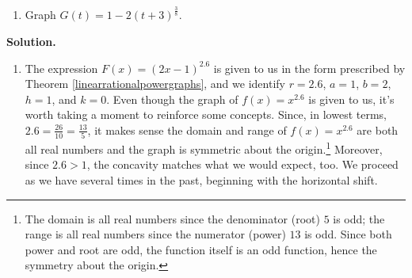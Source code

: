 \documentclass{ximera}
\begin{document}
\begin{example}
\begin{enumerate}
\item  Graph $G(t) = 1 - 2(t+3)^{\frac{3}{8}}$.


\end{enumerate}

 \begin{image}
\end{image}


{\bf Solution.}

\begin{enumerate}

\item  The expression  $F(x) = (2x-1)^{2.6}$ is given to us in the form prescribed by Theorem \ref{linearrationalpowergraphs}, and we identify $r = 2.6$, $a = 1$, $b=2$, $h=1$, and $k=0$.  Even though the graph of $f(x) = x^{2.6}$ is given to us, it's worth taking a moment to reinforce some concepts.  Since, in lowest terms, $2.6 = \frac{26}{10} = \frac{13}{5}$, it makes sense the domain and range of $f(x) = x^{2.6}$ are both all real numbers and the graph is symmetric about the origin.\footnote{The domain is all real numbers since the denominator (root) $5$ is odd;  the range is all real numbers since the numerator (power) $13$ is odd.  Since both power and root are odd, the function itself is an odd function, hence the symmetry about the origin.} Moreover, since $2.6>1$, the concavity matches what we would expect, too.  We proceed as we have several times in the past, beginning with the horizontal shift.


\end{enumerate}
\end{example}
\end{document}
